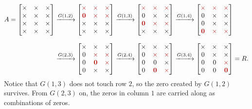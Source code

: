 \begin{align*}
  A = \begin{bmatrix} \times & \times & \times \\ \times & \times & \times \\ \times & \times & \times \\ \times & \times & \times \end{bmatrix}
  &\xrightarrow{G(1, 2)} \begin{bmatrix} \Xc & \Xc & \Xc \\ \Zc & \Xc & \Xc \\ \times & \times & \times \\ \times & \times & \times \end{bmatrix}
  \xrightarrow{G(1, 3)} \begin{bmatrix} \Xc & \Xc & \Xc \\ 0 & \times & \times \\ \Zc & \Xc & \Xc \\ \times & \times & \times \end{bmatrix}
  \xrightarrow{G(1, 4)} \begin{bmatrix} \Xc & \Xc & \Xc \\ 0 & \times & \times \\ 0 & \times & \times \\ \Zc & \Xc & \Xc \end{bmatrix} \\[8pt]
  &\xrightarrow{G(2, 3)} \begin{bmatrix} \times & \times & \times \\ 0 & \Xc & \Xc \\ 0 & \Zc & \Xc \\ 0 & \times & \times \end{bmatrix}
  \xrightarrow{G(2, 4)} \begin{bmatrix} \times & \times & \times \\ 0 & \Xc & \Xc \\ 0 & 0 & \times \\ 0 & \Zc & \Xc \end{bmatrix}
  \xrightarrow{G(3, 4)} \begin{bmatrix} \times & \times & \times \\ 0 & \times & \times \\ 0 & 0 & \Xc \\ 0 & 0 & \Zc \end{bmatrix} = R.
\end{align*}
\endgroup
Notice that $G(1, 3)$ does not touch row $2$, so the zero created by $G(1, 2)$ survives. From $G(2, 3)$ on, the zeros in column $1$ are carried along as combinations of zeros.

